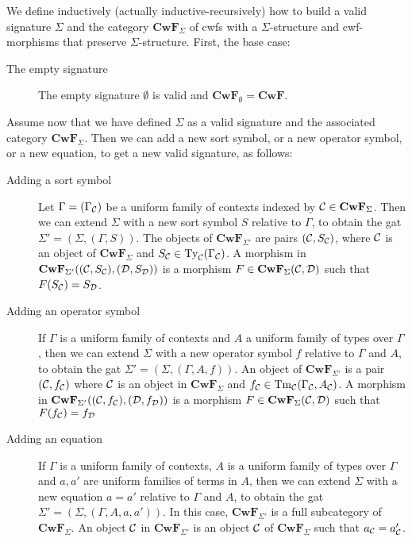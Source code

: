 \documentclass{lmcs}
\def\D{\mathcal{D}}
\def\Cwf{\mathbf{CwF}}
\begin{document}
\begin{definition}\label{def-sig-mod}
We define inductively (actually inductive-recursively) how to build a valid signature $\Sigma$ and the category $\Cwf_\Sigma$ of cwfs with a $\Sigma$-structure and cwf-morphisms that preserve $\Sigma$-structure. First, the base case:
\begin{description}
\item[The empty signature] The empty signature $\emptyset$ is valid and $\Cwf_\emptyset = \Cwf$.
\end{description}
Assume now that we have defined $\Sigma$ as a valid signature and the associated
category $\Cwf_{\Sigma}$.
Then we can add a new sort symbol, or a new operator symbol, or a new equation, to get a new valid signature,
as follows:
\begin{description}
\item[Adding a sort symbol]
  Let $\Gamma = (\Gamma_{\mathcal C})$ be a uniform family of contexts indexed by $\C \in \Cwf_{\Sigma}$.
  Then we can extend $\Sigma$ with a new sort symbol $S$ relative to $\Gamma$, to obtain
  the gat $\Sigma' = (\Sigma,(\Gamma,S))$.
  The objects of $\Cwf_{\Sigma'}$ are pairs $({\mathcal C},S_{{\mathcal C}})$, where ${\mathcal C}$ is an object of $\Cwf_{\Sigma}$
  and $S_{{\mathcal C}} \in \mathrm{Ty}_{\mathcal C}(\Gamma_{{\mathcal C}})$.
  A morphism in $\Cwf_{\Sigma'}((\C,S_{\C}), (\D,S_{\D}))$
  is a morphism $F \in \Cwf_{\Sigma}(\C,\D)$ such that $F(S_\C) = S_\D$.
\item[Adding an operator symbol]
  If $\Gamma$ is a uniform family of contexts and $A$ a uniform family of
  types over $\Gamma$, 
  then we can extend $\Sigma$ with a new operator
  symbol $f$ relative to $\Gamma$ and $A$, to obtain
  the gat $\Sigma' = (\Sigma,(\Gamma,A,f))$.
  An object of $\Cwf_{\Sigma'}$
  is a pair $({\mathcal C},f_{{\mathcal C}})$ where ${\mathcal C}$ is an object in $\Cwf_{\Sigma}$ and $f_{{\mathcal C}} \in \mathrm{Tm}_{\mathcal C}(\Gamma_{\mathcal C},A_{\mathcal C})$.
  A morphism in $\Cwf_{\Sigma'}((\C,f_{\C}),(\D,f_{\D}))$ is a morphism $F \in \Cwf_{\Sigma}(\C,\D)$ such that $F(f_{\C}) = f_{\D}$
\item[Adding an equation]
  If $\Gamma$ is a uniform family of contexts,
  $A$ is a uniform family of types over $\Gamma$
  and $a,a'$ are uniform families of terms in $A$, 
  then we can extend $\Sigma$ with a new equation $a = a'$ relative to $\Gamma$ and $A$, to obtain
  the gat $\Sigma' = (\Sigma,(\Gamma,A,a,a'))$.
  In this case,
  $\Cwf_{\Sigma'}$ is a full subcategory of $\Cwf_{\Sigma}$. An object ${\mathcal C}$ in
  $\Cwf_{\Sigma'}$ is an object ${\mathcal C}$ of $\Cwf_\Sigma$ such that $a_{{\mathcal C}} = a'_{{\mathcal C}}$.
\end{description}

\end{definition}
\end{document}
